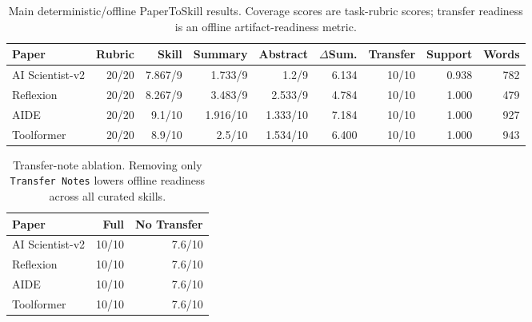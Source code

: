 \begin{table}[t]
\centering
\caption{Main deterministic/offline PaperToSkill results. Coverage scores are task-rubric scores; transfer readiness is an offline artifact-readiness metric.}
\label{tab:main-results}
\begin{tabular}{lrrrrrrrr}
\toprule
Paper & Rubric & Skill & Summary & Abstract & $\Delta$Sum. & Transfer & Support & Words \\
\midrule
AI Scientist-v2 & 20/20 & 7.867/9 & 1.733/9 & 1.2/9 & 6.134 & 10/10 & 0.938 & 782 \\
Reflexion & 20/20 & 8.267/9 & 3.483/9 & 2.533/9 & 4.784 & 10/10 & 1.000 & 479 \\
AIDE & 20/20 & 9.1/10 & 1.916/10 & 1.333/10 & 7.184 & 10/10 & 1.000 & 927 \\
Toolformer & 20/20 & 8.9/10 & 2.5/10 & 1.534/10 & 6.400 & 10/10 & 1.000 & 943 \\
\bottomrule
\end{tabular}
\end{table}

\begin{table}[t]
\centering
\caption{Transfer-note ablation. Removing only \texttt{Transfer Notes} lowers offline readiness across all curated skills.}
\label{tab:transfer-ablation}
\begin{tabular}{lrr}
\toprule
Paper & Full & No Transfer \\
\midrule
AI Scientist-v2 & 10/10 & 7.6/10 \\
Reflexion & 10/10 & 7.6/10 \\
AIDE & 10/10 & 7.6/10 \\
Toolformer & 10/10 & 7.6/10 \\
\bottomrule
\end{tabular}
\end{table}
